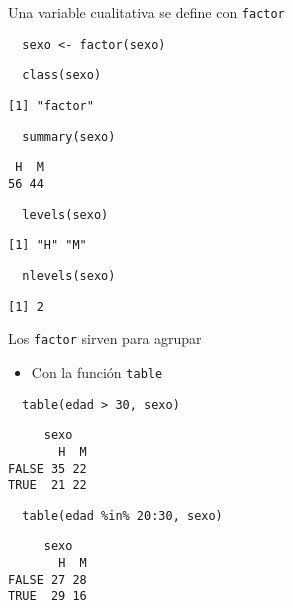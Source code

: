 \documentclass[xcolor={usenames,svgnames,dvipsnames}]{beamer}
\begin{document}
\begin{frame}[fragile,label=sec-1-2]{Una variable cualitativa se define con \texttt{factor}}
 \lstset{language=R,label= ,caption= ,numbers=none}
\begin{lstlisting}
  sexo <- factor(sexo)
\end{lstlisting}

\lstset{language=R,label= ,caption= ,numbers=none}
\begin{lstlisting}
  class(sexo)
\end{lstlisting}

\begin{verbatim}
[1] "factor"
\end{verbatim}

\lstset{language=R,label= ,caption= ,numbers=none}
\begin{lstlisting}
  summary(sexo)
\end{lstlisting}

\begin{verbatim}
 H  M 
56 44
\end{verbatim}

\lstset{language=R,label= ,caption= ,numbers=none}
\begin{lstlisting}
  levels(sexo)
\end{lstlisting}

\begin{verbatim}
[1] "H" "M"
\end{verbatim}

\lstset{language=R,label= ,caption= ,numbers=none}
\begin{lstlisting}
  nlevels(sexo)
\end{lstlisting}

\begin{verbatim}
[1] 2
\end{verbatim}
\end{frame}

\begin{frame}[fragile,label=sec-1-3]{Los \texttt{factor} sirven para agrupar}
 \begin{itemize}
\item Con la función \texttt{table}
\end{itemize}
\lstset{language=R,label= ,caption= ,numbers=none}
\begin{lstlisting}
  table(edad > 30, sexo)
\end{lstlisting}

\begin{verbatim}
     sexo
       H  M
FALSE 35 22
TRUE  21 22
\end{verbatim}

\lstset{language=R,label= ,caption= ,numbers=none}
\begin{lstlisting}
  table(edad %in% 20:30, sexo)
\end{lstlisting}

\begin{verbatim}
     sexo
       H  M
FALSE 27 28
TRUE  29 16
\end{verbatim}
\end{frame}
\end{document}
